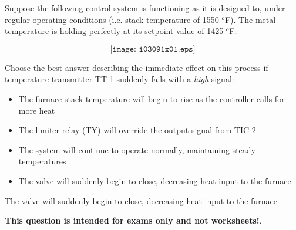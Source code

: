 

Suppose the following control system is functioning as it is designed to, under regular operating conditions (i.e. stack temperature of 1550 $^{o}$F).  The metal temperature is holding perfectly at its setpoint value of 1425 $^{o}$F:

$$\texttt{[image: i03091x01.eps]}$$

\noindent
Choose the best answer describing the immediate effect on this process if temperature transmitter TT-1 suddenly fails with a {\it high} signal:

\begin{itemize}
\item{} The furnace stack temperature will begin to rise as the controller calls for more heat
\vskip 10pt
\item{} The limiter relay (TY) will override the output signal from TIC-2
\vskip 10pt
\item{} The system will continue to operate normally, maintaining steady temperatures
\vskip 10pt
\item{} The valve will suddenly begin to close, decreasing heat input to the furnace
\end{itemize}







The valve will suddenly begin to close, decreasing heat input to the furnace







{\bf This question is intended for exams only and not worksheets!}.




